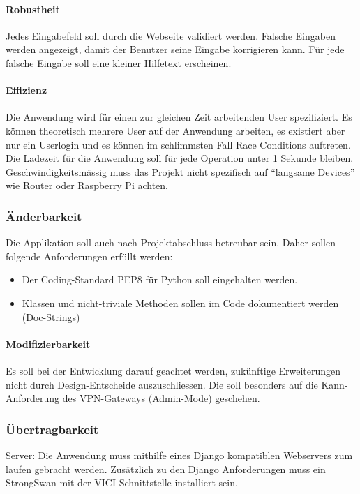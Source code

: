 \paragraph{Robustheit}
Jedes Eingabefeld soll durch die Webseite validiert werden. Falsche Eingaben werden angezeigt, damit der Benutzer seine Eingabe korrigieren kann. Für jede falsche Eingabe soll eine kleiner Hilfetext erscheinen.
\paragraph{Effizienz}
Die Anwendung wird für einen zur gleichen Zeit arbeitenden User spezifiziert. Es können theoretisch mehrere User auf der Anwendung arbeiten, es existiert aber nur ein Userlogin und es können im schlimmsten Fall Race Conditions auftreten.
Die Ladezeit für die Anwendung soll für jede Operation unter 1 Sekunde bleiben. Geschwindigkeitsmässig muss das Projekt nicht spezifisch auf “langsame Devices” wie Router oder Raspberry Pi achten.

\subsubsection{Änderbarkeit}
Die Applikation soll auch nach Projektabschluss betreubar sein. Daher sollen folgende Anforderungen erfüllt werden: 
\begin{itemize}
	\item Der Coding-Standard PEP8 für Python soll eingehalten werden.
	\item Klassen und nicht-triviale Methoden sollen im Code dokumentiert werden (Doc-Strings)
\end{itemize}

\paragraph{Modifizierbarkeit}
Es soll bei der Entwicklung darauf geachtet werden, zukünftige Erweiterungen nicht durch Design-Entscheide auszuschliessen. Die soll besonders auf die Kann-Anforderung des VPN-Gateways (Admin-Mode) geschehen.


\subsubsection{Übertragbarkeit}
Server: Die Anwendung muss mithilfe eines Django kompatiblen Webservers zum laufen gebracht werden. Zusätzlich zu den Django Anforderungen muss ein StrongSwan mit der VICI Schnittstelle installiert sein.

